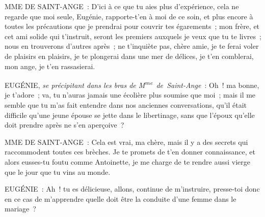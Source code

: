 \documentclass[french,twoside]{book} %
\begin{document}
MME DE SAINT-ANGE : D’ici à ce que tu aies plus d’expérience, cela ne regarde que moi seule, Eugénie, rapporte-t’en à moi de ce soin, et plus encore à toutes les précautions que je prendrai pour couvrir tes égarements ; mon frère, et cet ami solide qui t’instruit, seront les premiers auxquels je veux que tu te livres ; nous en trouverons d’autres après ; ne t’inquiète pas, chère amie, je te ferai voler de plaisirs en plaisirs, je te plongerai dans une mer de délices, je t’en comblerai, mon ange, je t’en rassasierai.\par
EUGÉNIE, {\itshape se précipitant dans les bras de M\textsuperscript{me} de Saint-Ange} : Oh ! ma bonne, je t’adore ; va, tu n’auras jamais une écolière plus soumise que moi ; mais il me semble que tu m’as fait entendre dans nos anciennes conversations, qu’il était difficile qu’une jeune épouse se jette dans le libertinage, sans que l’époux qu’elle doit prendre après ne s’en aperçoive ?\par
MME DE SAINT-ANGE : Cela est vrai, ma chère, mais il y a des secrets qui raccommodent toutes ces brèches. Je te promets de t’en donner connaissance, et alors eusses-tu foutu comme Antoinette, je me charge de te rendre aussi vierge que le jour que tu vins au monde.\par
EUGÉNIE : Ah ! tu es délicieuse, allons, continue de m’instruire, presse-toi donc en ce cas de m’apprendre quelle doit être la conduite d’une femme dans le mariage ?\par
\end{document}
